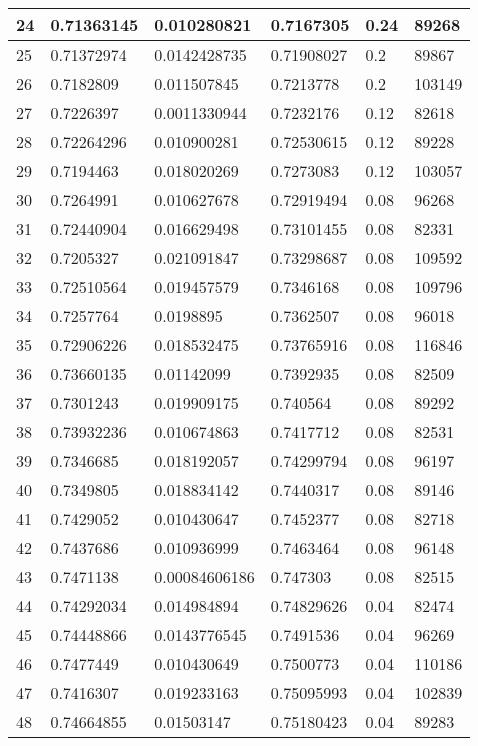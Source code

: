 \begin{longtable}{|l|l|l|l|l|l|}
24 & 0.71363145 & 0.010280821 & 0.7167305 & 0.24 & 89268 \\ \hline 
25 & 0.71372974 & 0.0142428735 & 0.71908027 & 0.2 & 89867 \\ \hline 
26 & 0.7182809 & 0.011507845 & 0.7213778 & 0.2 & 103149 \\ \hline 
27 & 0.7226397 & 0.0011330944 & 0.7232176 & 0.12 & 82618 \\ \hline 
28 & 0.72264296 & 0.010900281 & 0.72530615 & 0.12 & 89228 \\ \hline 
29 & 0.7194463 & 0.018020269 & 0.7273083 & 0.12 & 103057 \\ \hline 
30 & 0.7264991 & 0.010627678 & 0.72919494 & 0.08 & 96268 \\ \hline 
31 & 0.72440904 & 0.016629498 & 0.73101455 & 0.08 & 82331 \\ \hline 
32 & 0.7205327 & 0.021091847 & 0.73298687 & 0.08 & 109592 \\ \hline 
33 & 0.72510564 & 0.019457579 & 0.7346168 & 0.08 & 109796 \\ \hline 
34 & 0.7257764 & 0.0198895 & 0.7362507 & 0.08 & 96018 \\ \hline 
35 & 0.72906226 & 0.018532475 & 0.73765916 & 0.08 & 116846 \\ \hline 
36 & 0.73660135 & 0.01142099 & 0.7392935 & 0.08 & 82509 \\ \hline 
37 & 0.7301243 & 0.019909175 & 0.740564 & 0.08 & 89292 \\ \hline 
38 & 0.73932236 & 0.010674863 & 0.7417712 & 0.08 & 82531 \\ \hline 
39 & 0.7346685 & 0.018192057 & 0.74299794 & 0.08 & 96197 \\ \hline 
40 & 0.7349805 & 0.018834142 & 0.7440317 & 0.08 & 89146 \\ \hline 
41 & 0.7429052 & 0.010430647 & 0.7452377 & 0.08 & 82718 \\ \hline 
42 & 0.7437686 & 0.010936999 & 0.7463464 & 0.08 & 96148 \\ \hline 
43 & 0.7471138 & 0.00084606186 & 0.747303 & 0.08 & 82515 \\ \hline 
44 & 0.74292034 & 0.014984894 & 0.74829626 & 0.04 & 82474 \\ \hline 
45 & 0.74448866 & 0.0143776545 & 0.7491536 & 0.04 & 96269 \\ \hline 
46 & 0.7477449 & 0.010430649 & 0.7500773 & 0.04 & 110186 \\ \hline 
47 & 0.7416307 & 0.019233163 & 0.75095993 & 0.04 & 102839 \\ \hline 
48 & 0.74664855 & 0.01503147 & 0.75180423 & 0.04 & 89283 \\ \hline 

\end{longtable}
